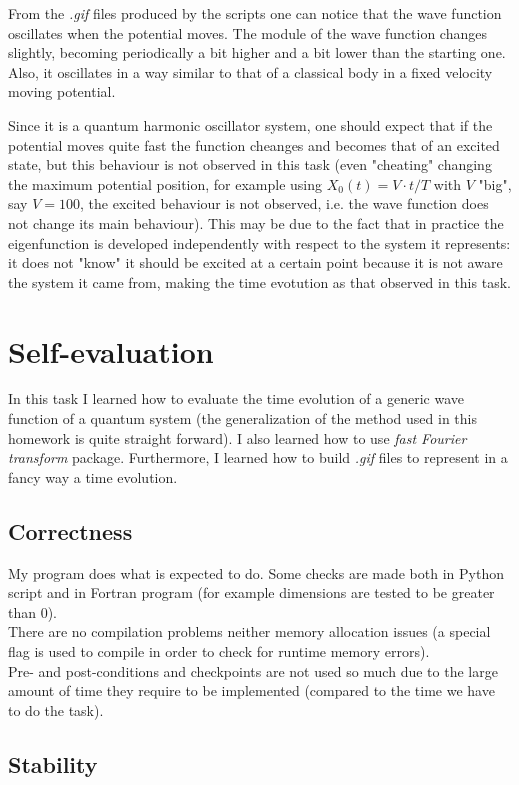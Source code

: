 \documentclass[12pt, a4paper, notitlepage]{report}
\begin{document}
From the \textit{.gif} files produced by the scripts one can notice that the wave function oscillates when the potential moves. The module of the wave function changes slightly, becoming periodically a bit higher and a bit lower than the starting one. Also, it oscillates in a way similar to that of a classical body in a fixed velocity moving potential.

Since it is a quantum harmonic oscillator system, one should expect that if the potential moves quite fast the function cheanges and becomes that of an excited state, but this behaviour is not observed in this task (even "cheating" changing the maximum potential position, for example using $X_0(t) = V \cdot t/T$ with $V$ "big", say $V=100$, the excited behaviour is not observed, i.e. the wave function does not change its main behaviour). This may be due to the fact that in practice the eigenfunction is developed independently with respect to the system it represents: it does not "know" it should be excited at a certain point because it is not aware the system it came from, making the time evotution as that observed in this task.

\section*{Self-evaluation}
In this task I learned how to evaluate the time evolution of a generic wave function of a quantum system (the  generalization of the method used in this homework is quite straight forward). I also learned how to use \textit{fast Fourier transform} package. Furthermore, I learned how to build \textit{.gif} files to represent in a fancy way a time evolution.

\subsection*{Correctness}

My program does what is expected to do. Some checks are made both in Python script and in Fortran program (for example dimensions are tested to be greater than 0).\\
There are no compilation problems neither memory allocation issues (a special flag is used to compile in order to check for runtime memory errors).\\
Pre- and post-conditions and checkpoints are not used so much due to the large amount of time they require to be implemented (compared to the time we have to do the task).

\subsection*{Stability}
\end{document}

